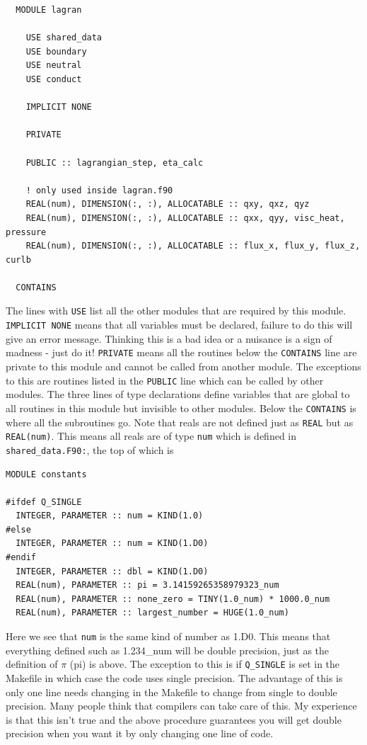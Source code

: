 \documentclass[11pt]{article}
\begin{document}
\begin{verbatim}
  MODULE lagran

    USE shared_data
    USE boundary
    USE neutral
    USE conduct

    IMPLICIT NONE

    PRIVATE

    PUBLIC :: lagrangian_step, eta_calc

    ! only used inside lagran.f90
    REAL(num), DIMENSION(:, :), ALLOCATABLE :: qxy, qxz, qyz
    REAL(num), DIMENSION(:, :), ALLOCATABLE :: qxx, qyy, visc_heat, pressure
    REAL(num), DIMENSION(:, :), ALLOCATABLE :: flux_x, flux_y, flux_z, curlb

  CONTAINS
\end{verbatim}
The lines with \texttt{USE} list all the other modules that are required by this module. \texttt{IMPLICIT NONE} means that all variables must be declared, failure to do this will give an error message. Thinking this is a bad idea or a nuisance is a sign of madness - just do it! \texttt{PRIVATE} means all the routines below the \texttt{CONTAINS} line are private to this module and cannot be called from another module. The exceptions to this are routines listed in the \texttt{PUBLIC} line which can be called by other modules. The three lines of type declarations define variables that are global to all routines in this module but invisible to other modules. Below the \texttt{CONTAINS} is where all the subroutines go. Note that reals are not defined just as \texttt{REAL} but as \texttt{REAL(num)}. This means all reals are of type \texttt{num} which is defined in {\texttt{shared\_data.F90:}}, the top of which is
\begin{verbatim}
MODULE constants

#ifdef Q_SINGLE
  INTEGER, PARAMETER :: num = KIND(1.0) 
#else
  INTEGER, PARAMETER :: num = KIND(1.D0) 
#endif
  INTEGER, PARAMETER :: dbl = KIND(1.D0)
  REAL(num), PARAMETER :: pi = 3.14159265358979323_num
  REAL(num), PARAMETER :: none_zero = TINY(1.0_num) * 1000.0_num
  REAL(num), PARAMETER :: largest_number = HUGE(1.0_num)
\end{verbatim}
Here we see that \texttt{num} is the same kind of number as 1.D0. This means that everything defined such as 1.234\_num will be double precision, just as the definition of $\pi$ (pi) is above. The exception to this is if \texttt{Q\_SINGLE} is set in the Makefile in which case the code uses single precision. The advantage of this is only one line needs changing in the Makefile to change from single to double precision. Many people think that compilers can take care of this. My experience is that this isn't true and the above procedure guarantees you will get double precision when you want it by only changing one line of code.
\end{document}
